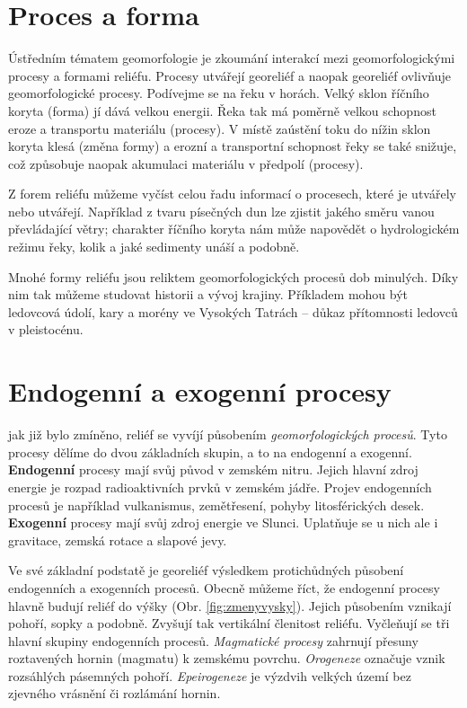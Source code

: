 \section{Proces a forma}
Ústředním tématem geomorfologie je zkoumání interakcí mezi geomorfologickými procesy a formami reliéfu. Procesy utvářejí georeliéf a naopak georeliéf ovlivňuje geomorfologické procesy. Podívejme se na řeku v horách. Velký sklon říčního koryta (forma) jí dává velkou energii. Řeka tak má poměrně velkou schopnost eroze a transportu materiálu (procesy). V místě zaústění toku do nížin sklon koryta klesá (změna formy) a erozní a transportní schopnost řeky se také snižuje, což způsobuje naopak akumulaci materiálu v předpolí (procesy).

Z forem reliéfu můžeme vyčíst celou řadu informací o procesech, které je utvářely nebo utvářejí. Například z tvaru písečných dun lze zjistit jakého směru vanou převládající větry; charakter říčního koryta nám může napovědět o hydrologickém režimu řeky, kolik a jaké sedimenty unáší a podobně. 

Mnohé formy reliéfu jsou reliktem geomorfologických procesů dob minulých. Díky nim tak můžeme studovat historii a vývoj krajiny. Příkladem mohou být ledovcová údolí, kary a morény ve Vysokých Tatrách -- důkaz přítomnosti ledovců v pleistocénu.

\section{Endogenní a exogenní procesy}
jak již bylo zmíněno, reliéf se vyvíjí působením \emph{geomorfologických procesů}. Tyto procesy dělíme do dvou základních skupin, a to na endogenní a exogenní. \textbf{Endogenní} procesy mají svůj původ v zemském nitru. Jejich hlavní zdroj energie je rozpad radioaktivních prvků v zemském jádře. Projev endogenních procesů je například vulkanismus, zemětřesení, pohyby litosférických desek. \textbf{Exogenní} procesy mají svůj zdroj energie ve Slunci. Uplatňuje se u nich ale i gravitace, zemská rotace a slapové jevy. 

Ve své základní podstatě je georeliéf výsledkem protichůdných působení endogenních a exogenních procesů. Obecně můžeme říct, že endogenní procesy hlavně budují reliéf do výšky (Obr. \ref{fig:zmenyvysky}). Jejich působením vznikají pohoří, sopky a podobně. Zvyšují tak vertikální členitost reliéfu. Vyčleňují se tři  hlavní skupiny endogenních procesů. \emph{Magmatické procesy} zahrnují přesuny roztavených hornin (magmatu) k zemskému povrchu. \emph{Orogeneze} označuje vznik rozsáhlých pásemných pohoří. \emph{Epeirogeneze} je výzdvih velkých území bez zjevného vrásnění či rozlámání hornin. 

